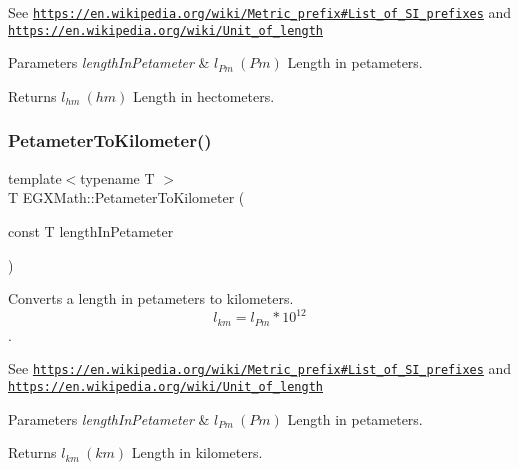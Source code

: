 See \href{https://en.wikipedia.org/wiki/Metric_prefix#List_of_SI_prefixes}{\tt https\+://en.\+wikipedia.\+org/wiki/\+Metric\+\_\+prefix\#\+List\+\_\+of\+\_\+\+S\+I\+\_\+prefixes} and \href{https://en.wikipedia.org/wiki/Unit_of_length}{\tt https\+://en.\+wikipedia.\+org/wiki/\+Unit\+\_\+of\+\_\+length} 
\begin{DoxyParams}{Parameters}
{\em length\+In\+Petameter} & $ l_{Pm}\ (Pm)$ Length in petameters. \\
\hline
\end{DoxyParams}
\begin{DoxyReturn}{Returns}
$ l_{hm}\ (hm)$ Length in hectometers. 
\end{DoxyReturn}
\mbox{\label{group___e_g_x_math-_conversions-_length_conversions-_petameter-_s_i_gadf5a6ef57468284f06662fd7c59ad5ee}} 
\subsubsection{\texorpdfstring{Petameter\+To\+Kilometer()}{PetameterToKilometer()}}
{\footnotesize\ttfamily template$<$typename T $>$ \\
T E\+G\+X\+Math\+::\+Petameter\+To\+Kilometer (\begin{DoxyParamCaption}\item[{const T}]{length\+In\+Petameter }\end{DoxyParamCaption})}



Converts a length in petameters to kilometers. \[ l_{km}=l_{Pm} * 10^{12} \]. 

See \href{https://en.wikipedia.org/wiki/Metric_prefix#List_of_SI_prefixes}{\tt https\+://en.\+wikipedia.\+org/wiki/\+Metric\+\_\+prefix\#\+List\+\_\+of\+\_\+\+S\+I\+\_\+prefixes} and \href{https://en.wikipedia.org/wiki/Unit_of_length}{\tt https\+://en.\+wikipedia.\+org/wiki/\+Unit\+\_\+of\+\_\+length} 
\begin{DoxyParams}{Parameters}
{\em length\+In\+Petameter} & $ l_{Pm}\ (Pm)$ Length in petameters. \\
\hline
\end{DoxyParams}
\begin{DoxyReturn}{Returns}
$ l_{km}\ (km)$ Length in kilometers. 
\end{DoxyReturn}
\mbox{\label{group___e_g_x_math-_conversions-_length_conversions-_petameter-_s_i_gabee8390ae6476b4718cf82fc87ae7a1e}} 
